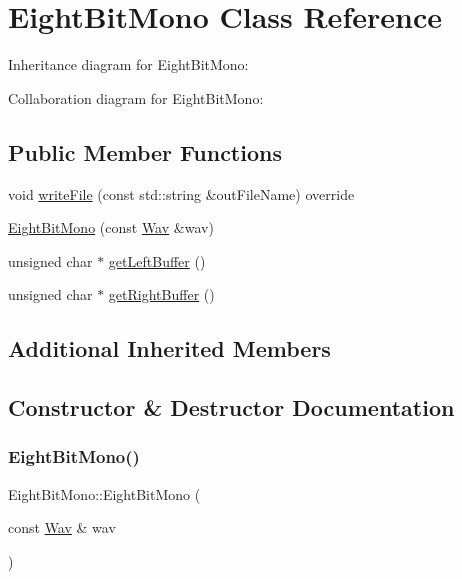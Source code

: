 \hypertarget{classEightBitMono}{}\section{Eight\+Bit\+Mono Class Reference}
\label{classEightBitMono}


Inheritance diagram for Eight\+Bit\+Mono\+:


Collaboration diagram for Eight\+Bit\+Mono\+:
\subsection*{Public Member Functions}
\begin{DoxyCompactItemize}
\item 
void \hyperlink{classEightBitMono_ae654eb1cc4fbb5586b33a73081cfb033}{write\+File} (const std\+::string \&out\+File\+Name) override
\item 
\hyperlink{classEightBitMono_a08f1f216daab7c5c89070c71ef0f4af0}{Eight\+Bit\+Mono} (const \hyperlink{classWav}{Wav} \&wav)
\item 
unsigned char $\ast$ \hyperlink{classEightBitMono_a70e3b0ee28587aee861ac1c68c7a7546}{get\+Left\+Buffer} ()
\item 
unsigned char $\ast$ \hyperlink{classEightBitMono_ae04b3f0e68a021cd8466b564c30c2e57}{get\+Right\+Buffer} ()
\end{DoxyCompactItemize}
\subsection*{Additional Inherited Members}


\subsection{Constructor \& Destructor Documentation}
\mbox{\label{classEightBitMono_a08f1f216daab7c5c89070c71ef0f4af0}} 
\subsubsection{\texorpdfstring{Eight\+Bit\+Mono()}{EightBitMono()}}
{\footnotesize\ttfamily Eight\+Bit\+Mono\+::\+Eight\+Bit\+Mono (\begin{DoxyParamCaption}\item[{const \hyperlink{classWav}{Wav} \&}]{wav }\end{DoxyParamCaption})}

